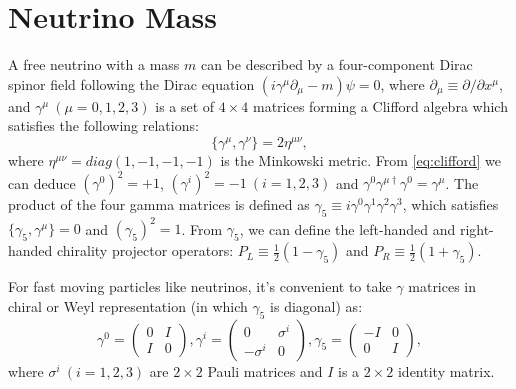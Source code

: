 \section{Neutrino Mass}\label{section:Majorana}
A free neutrino with a mass $m$ can be described by a four-component Dirac spinor field following the Dirac equation $(i\gamma^\mu\partial_\mu-m)\psi=0$, where $\partial_\mu\equiv \partial/\partial x^\mu$, and $\gamma^\mu~(\mu=0,1,2,3)$ is a set of $4\times 4$ matrices forming a Clifford algebra which satisfies the following relations\cite{akhmedov2014majorana,zee2010quantum}:
\begin{equation}\label{eq:clifford}
\{\gamma^\mu,\gamma^\nu\}=2\eta^{\mu\nu},
\end{equation}
where $\eta^{\mu\nu}=diag(1,-1,-1,-1)$ is the Minkowski metric. From \ref{eq:clifford} we can deduce $(\gamma^0)^2=+1$, $(\gamma^i)^2=-1~(i=1,2,3)$ and $\gamma^0\gamma^{\mu\dag}\gamma^0=\gamma^\mu$. The product of the four gamma matrices is defined as $\gamma_5\equiv i\gamma^0\gamma^1\gamma^2\gamma^3$, which satisfies $\{\gamma_5,\gamma^\mu\}=0$ and $(\gamma_5)^2=1$. From $\gamma_5$, we can define the left-handed and right-handed chirality projector operators: $P_L\equiv\frac{1}{2}(1-\gamma_5)$ and $P_R\equiv\frac{1}{2}(1+\gamma_5)$.

For fast moving particles like neutrinos, it's convenient to take $\gamma$ matrices in chiral or Weyl representation (in which $\gamma_5$ is diagonal) as\cite{zee2010quantum}:
\begin{equation}
\gamma^0 = \begin{pmatrix} 
0 & I \\
I & 0
\end{pmatrix},
\gamma^i = \begin{pmatrix} 
0 & \sigma^i \\
-\sigma^i & 0
\end{pmatrix},
\gamma_5 = \begin{pmatrix} 
-I & 0 \\
0 & I
\end{pmatrix},
\end{equation}
where $\sigma^i~(i=1,2,3)$ are $2\times 2$ Pauli matrices and $I$ is a $2\times 2$ identity matrix.


